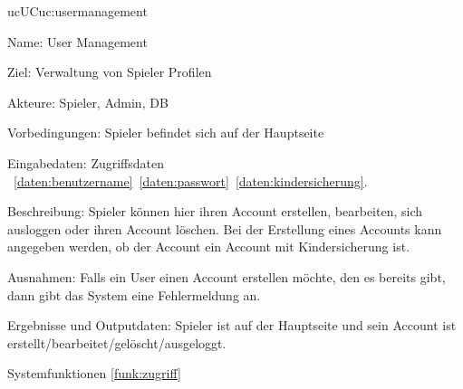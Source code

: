 \begin{description}[leftmargin=5em, style=sameline]


	\begin{lhp}{uc}{UC}{uc:usermanagement}
		\item [Name:] User Management
		\item [Ziel:] Verwaltung von Spieler Profilen
		\item [Akteure:] Spieler, Admin, DB
		\item [Vorbedingungen:] Spieler befindet sich auf der Hauptseite
		\item [Eingabedaten:] Zugriffsdaten ~\ref{daten:benutzername}~\ref{daten:passwort}~\ref{daten:kindersicherung}.
		\item [Beschreibung:] Spieler können hier ihren Account erstellen, bearbeiten, sich ausloggen oder ihren Account löschen. Bei der Erstellung eines Accounts kann angegeben werden, ob der Account ein Account mit Kindersicherung ist.
		\item [Ausnahmen:] Falls ein User einen Account erstellen möchte, den es bereits gibt, dann gibt das System eine Fehlermeldung an. 
		\item [Ergebnisse und Outputdaten:] Spieler ist auf der Hauptseite und sein Account ist erstellt/bearbeitet/gelöscht/ausgeloggt.
		\item [Systemfunktionen] \ref{funk:zugriff}
	\end{lhp}


\end{description}
